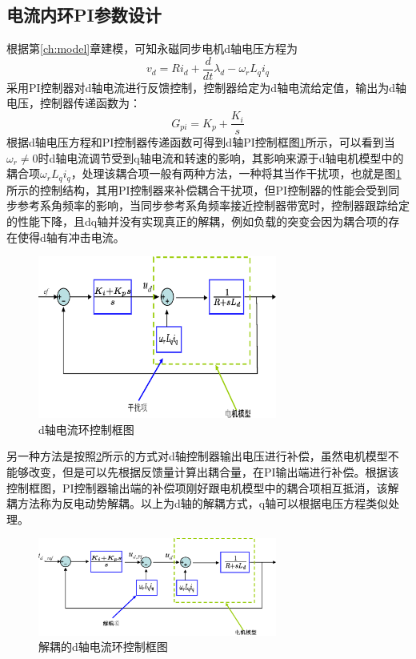 \subsection{电流内环PI参数设计}
根据第\ref{ch:model}章建模，可知永磁同步电机d轴电压方程为
\begin{equation}\label{eq:voltage_d}
v_{d}=Ri_{d}+\frac{d}{dt}\lambda_{d}-\omega_{r}L_{q}i_{q}
\end{equation}
采用PI控制器对d轴电流进行反馈控制，控制器给定为d轴电流给定值，输出为d轴电压，控制器传递函数为：
\begin{equation}\label{eq:PI_controller}
	G_{pi}=K_{p}+\frac{K_{i}}{s}
\end{equation}
根据d轴电压方程和PI控制器传递函数可得到d轴PI控制框图\ref{fig:d_PI}所示，可以看到当$\omega_{r}\neq0$时d轴电流调节受到q轴电流和转速的影响，其影响来源于d轴电机模型中的耦合项$\omega_{r}L_{q}i_{q}$，处理该耦合项一般有两种方法，一种将其当作干扰项，也就是图\ref{fig:d_PI}所示的控制结构，其用PI控制器来补偿耦合干扰项，但PI控制器的性能会受到同步参考系角频率的影响，当同步参考系角频率接近控制器带宽时，控制器跟踪给定的性能下降，且dq轴并没有实现真正的解耦，例如负载的突变会因为耦合项的存在使得d轴有冲击电流。
\begin{figure}[H]
	\centering
	\includegraphics[width=0.7\textwidth]{figs/d_PI.eps}
	\caption{d轴电流环控制框图}
	\label{fig:d_PI}
\end{figure}
另一种方法是按照\ref{fig:d_PI_decoupled}所示的方式对d轴控制器输出电压进行补偿，虽然电机模型不能够改变，但是可以先根据反馈量计算出耦合量，在PI输出端进行补偿。根据该控制框图，PI控制器输出端的补偿项刚好跟电机模型中的耦合项相互抵消，该解耦方法称为反电动势解耦。以上为d轴的解耦方式，q轴可以根据电压方程类似处理。
\begin{figure}[H]
	\centering
	\includegraphics[width=0.7\textwidth]{figs/d_PI_decoupled.eps}
	\caption{解耦的d轴电流环控制框图}
	\label{fig:d_PI_decoupled}
\end{figure}
